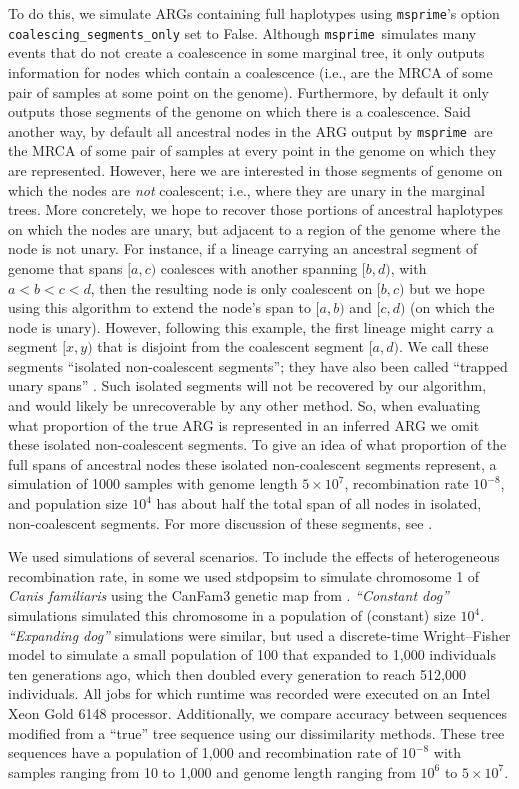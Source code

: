 \documentclass[10pt,twoside,lineno]{gsajnl}
\newcommand{\msprime}{\texttt{msprime}}
\begin{document}
To do this, we simulate ARGs containing full haplotypes using \msprime's 
option \texttt{coalescing\_segments\_only} set to False.
Although \msprime\ simulates many events that do not create a coalescence in some marginal tree,
it only outputs information for nodes which contain a coalescence
(i.e., are the MRCA of some pair of samples at some point on the genome).
Furthermore, by default it only outputs those segments of the genome
on which there is a coalescence.
Said another way, by default all ancestral nodes in the ARG
output by \msprime\ are the MRCA of some pair of samples at every point in the genome
on which they are represented.
However, here we are interested in those segments of genome
on which the nodes are \emph{not} coalescent;
i.e., where they are unary in the marginal trees.
More concretely, we hope to recover those portions of ancestral haplotypes
on which the nodes are unary, but adjacent to a region of the genome where the node is not unary.
For instance, if a lineage carrying an ancestral segment of genome that spans $[a, c)$
coalesces with another spanning $[b, d)$, with $a < b < c < d$,
then the resulting node is only coalescent on $[b, c)$ but we hope using this algorithm
to extend the node's span to $[a, b)$ and $[c, d)$
(on which the node is unary).
However, following this example, the first lineage might carry a segment $[x, y)$
that is disjoint from the coalescent segment $[a, d)$.
We call these segments ``isolated non-coalescent segments'';
they have also been called ``trapped unary spans'' \citep[by][]{XXX}.
Such isolated segments will not be recovered by our algorithm,
and would likely be unrecoverable by any other method.
So, when evaluating what proportion of the true ARG is represented in an inferred ARG
we omit these isolated non-coalescent segments.
To give an idea of what proportion of the full spans of ancestral nodes
these isolated non-coalescent segments represent,
a simulation of 1000 samples
with genome length $5\times 10^7$, recombination rate $10^{-8}$, and population size $10^4$
has about half the total span of all nodes in isolated, non-coalescent segments.
For more discussion of these segments, see \citet{baumdicker2021efficient}.

We used simulations of several scenarios.
To include the effects of heterogeneous recombination rate,
in some we used stdpopsim \citep{stdpopsim} 
to simulate chromosome 1 of \textit{Canis familiaris}
using the CanFam3 genetic map from \citet{campell2016}.
\emph{``Constant dog''} simulations simulated this chromosome in a 
population of (constant) size $10^4$.
\emph{``Expanding dog''} simulations were similar, but
used a discrete-time Wright--Fisher model to simulate
a small population of 100 that expanded to 1,000 individuals ten generations ago,
which then doubled every generation to reach 512,000 individuals.
All jobs for which runtime was recorded were executed on an Intel Xeon Gold 6148 processor.
 Additionally, we compare accuracy between sequences modified from a ``true'' tree sequence
 using our dissimilarity methods. 
 These tree sequences have a population of 1,000 and recombination rate of $10^{-8}$ with samples ranging from 10 to 1,000 and genome length ranging from $10^6$ to $5\times 10^7$.
\end{document}
